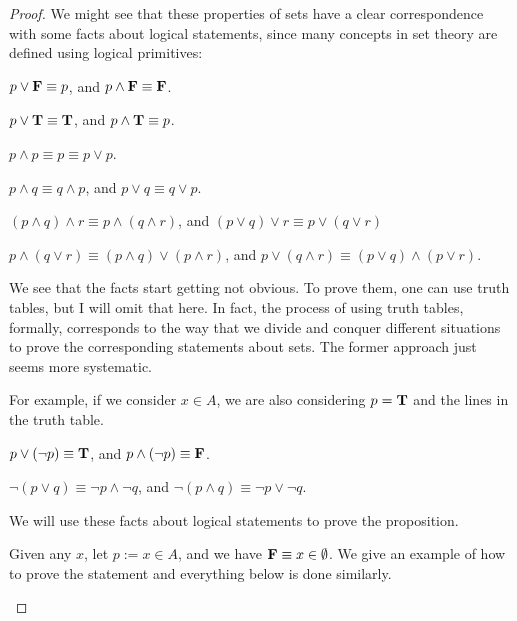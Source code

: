 \begin{proof}
	We might see that these properties of sets have a clear correspondence with some facts about logical statements, since many concepts in set theory are defined using logical primitives:
	\begin{enumabc}
		\item $p \vee \mathbf{F} \equiv p$, and $p \wedge \mathbf{F} \equiv \mathbf{F}$.
		
		\item $p \vee \mathbf{T} \equiv \mathbf{T}$, and $p \wedge \mathbf{T} \equiv p$.
		
		\item $p \wedge p \equiv p \equiv p \vee p$.
		
		\item $p \wedge q \equiv q \wedge p$, and $p \vee q \equiv q \vee p$.
		
		\item $(p \wedge q) \wedge r \equiv p \wedge (q \wedge r)$, and $(p \vee q) \vee r \equiv p \vee (q \vee r)$
		
		\item $p \wedge (q \vee r) \equiv (p \wedge q) \vee (p \wedge r)$, and $p \vee (q \wedge r) \equiv (p \vee q) \wedge (p \vee r)$.
		
		We see that the facts start getting not obvious. To prove them, one can use truth tables, but I will omit that here. In fact, the process of using truth tables, formally, corresponds to the way that we divide and conquer different situations to prove the corresponding statements about sets. The former approach just seems more systematic.
		
		For example, if we consider $x \in A$, we are also considering $p = \mathbf{T}$ and the lines in the truth table.
		
		\item $p \vee (\neg p) \equiv \mathbf{T}$, and $p \wedge (\neg p) \equiv \mathbf{F}$.
		
		\item $\neg(p \vee q) \equiv \neg p \wedge \neg q$, and $\neg (p \wedge q) \equiv \neg p \vee \neg q$.
	\end{enumabc}

	We will use these facts about logical statements to prove the proposition.
	\begin{enumabc}
		\item Given any $x$, let $p := x \in A$, and we have $\mathbf{F} \equiv x \in \emptyset$. We give an example of how to prove the statement and everything below is done similarly.
		

\end{enumabc}
\end{proof}
